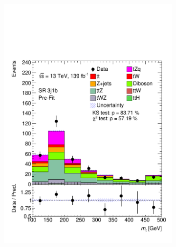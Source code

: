 \begin{figure}[!h]
\begin{subfigure}[b]{0.32\linewidth}
    \includegraphics[width=\linewidth]{ubonn-thesis/Chapters/Chapters_06/Figure/Input_distribution/SR_3j1b_Top_mass.pdf} 
  \end{subfigure} 
  \begin{subfigure}[b]{0.32\linewidth}
    \centering

\end{subfigure}
\end{figure}
